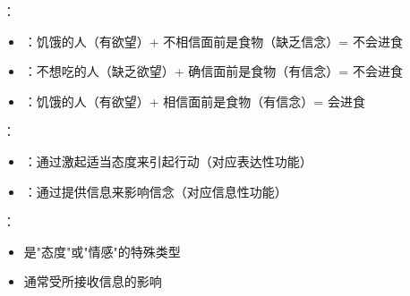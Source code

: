 \begin{examplebox}[title=欲望与信念的相互作用]
：
\begin{itemize}
  \item {}：饥饿的人（有欲望）+ 不相信面前是食物（缺乏信念）= 不会进食
  \item {}：不想吃的人（缺乏欲望）+ 确信面前是食物（有信念）= 不会进食
  \item {}：饥饿的人（有欲望）+ 相信面前是食物（有信念）= 会进食
\end{itemize}
\end{examplebox}

\begin{theorembox}[title=语言功能与行动动机的对应]
：
\begin{itemize}
  \item {}：通过激起适当态度来引起行动（对应表达性功能）
  \item {}：通过提供信息来影响信念（对应信息性功能）
\end{itemize}

：
\begin{itemize}
  \item {}是"态度"或"情感"的特殊类型
  \item {}通常受所接收信息的影响
\end{itemize}
\end{theorembox}


